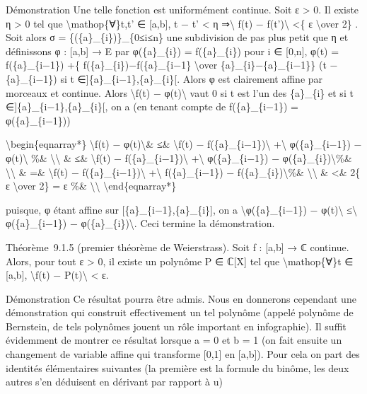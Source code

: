 \documentclass[]{article}
\begin{document}
Démonstration Une telle fonction est uniformément continue. Soit ε
\textgreater{} 0. Il existe η \textgreater{} 0 tel que
\textbackslash{}mathop\{∀\}t,t' ∈ {[}a,b{]}, \textbar{}t − t'\textbar{}
\textless{} η ⇒\textbackslash{}\textbar{} f(t) −
f(t')\textbackslash{}\textbar{} \textless{}\{ ε \textbackslash{}over 2\}
. Soit alors σ = \{(\{a\}\_\{i\})\}\_\{0≤i≤n\} une subdivision de pas
plus petit que η et définissons φ : {[}a,b{]} → E par φ(\{a\}\_\{i\}) =
f(\{a\}\_\{i\}) pour i ∈ {[}0,n{]}, φ(t) = f(\{a\}\_\{i−1\}) +\{
f(\{a\}\_\{i\})−f(\{a\}\_\{i−1\} \textbackslash{}over
\{a\}\_\{i\}−\{a\}\_\{i−1\}\} (t − \{a\}\_\{i−1\}) si t
∈{]}\{a\}\_\{i−1\},\{a\}\_\{i\}{[}. Alors φ est clairement affine par
morceaux et continue. Alors \textbackslash{}\textbar{}f(t) −
φ(t)\textbackslash{}\textbar{} vaut 0 si t est l'un des \{a\}\_\{i\} et
si t ∈{]}\{a\}\_\{i−1\},\{a\}\_\{i\}{[}, on a (en tenant compte de
f(\{a\}\_\{i−1\}) = φ(\{a\}\_\{i−1\}))

\textbackslash{}begin\{eqnarray*\} \textbackslash{}\textbar{}f(t) −
φ(t)\textbackslash{}\textbar{}\& ≤\& \textbackslash{}\textbar{}f(t) −
f(\{a\}\_\{i−1\})\textbackslash{}\textbar{} +\textbackslash{}\textbar{}
φ(\{a\}\_\{i−1\}) − φ(t)\textbackslash{}\textbar{} \%\&
\textbackslash{}\textbackslash{} \& ≤\& \textbackslash{}\textbar{}f(t) −
f(\{a\}\_\{i−1\})\textbackslash{}\textbar{} +\textbackslash{}\textbar{}
φ(\{a\}\_\{i−1\}) − φ(\{a\}\_\{i\})\textbackslash{}\textbar{}\%\&
\textbackslash{}\textbackslash{} \& =\& \textbackslash{}\textbar{}f(t) −
f(\{a\}\_\{i−1\})\textbackslash{}\textbar{} +\textbackslash{}\textbar{}
f(\{a\}\_\{i−1\}) − f(\{a\}\_\{i\})\textbackslash{}\textbar{}\%\&
\textbackslash{}\textbackslash{} \& \textless{}\& 2\{ ε
\textbackslash{}over 2\} = ε \%\& \textbackslash{}\textbackslash{}
\textbackslash{}end\{eqnarray*\}

puisque, φ étant affine sur {[}\{a\}\_\{i−1\},\{a\}\_\{i\}{]}, on a
\textbackslash{}\textbar{}φ(\{a\}\_\{i−1\}) −
φ(t)\textbackslash{}\textbar{} ≤\textbackslash{}\textbar{}
φ(\{a\}\_\{i−1\}) − φ(\{a\}\_\{i\})\textbackslash{}\textbar{}. Ceci
termine la démonstration.

Théorème~9.1.5 (premier théorème de Weierstrass). Soit f : {[}a,b{]} → ℂ
continue. Alors, pour tout ε \textgreater{} 0, il existe un polynôme P ∈
ℂ{[}X{]} tel que \textbackslash{}mathop\{∀\}t ∈ {[}a,b{]},
\textbackslash{}\textbar{}f(t) − P(t)\textbackslash{}\textbar{}
\textless{} ε.

Démonstration Ce résultat pourra être admis. Nous en donnerons cependant
une démonstration qui construit effectivement un tel polynôme (appelé
polynôme de Bernstein, de tels polynômes jouent un rôle important en
infographie). Il suffit évidemment de montrer ce résultat lorsque a = 0
et b = 1 (on fait ensuite un changement de variable affine qui
transforme {[}0,1{]} en {[}a,b{]}). Pour cela on part des identités
élémentaires suivantes (la première est la formule du binôme, les deux
autres s'en déduisent en dérivant par rapport à u)
\end{document}
